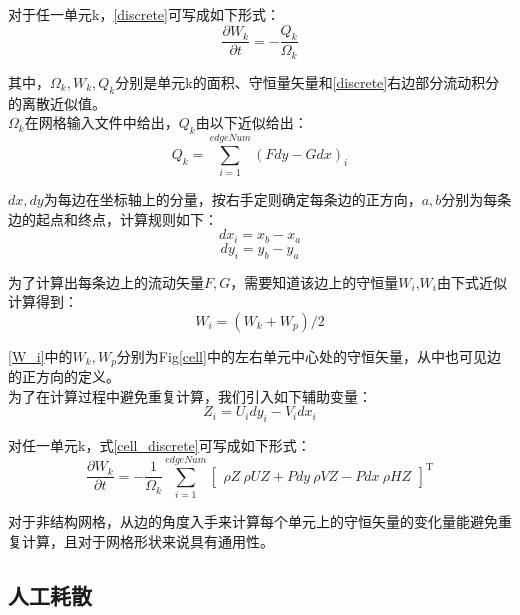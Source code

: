 \documentclass[UTF8]{ctexart}
\begin{document}
\indent 对于任一单元k，\eqref{discrete}可写成如下形式：
\begin{equation}\label{cell_discrete}
\frac{\partial W_k}{\partial t} = - \frac{Q_k}{\Omega_k}
\end{equation}

\indent 其中，$\Omega_k, W_k, Q_k$分别是单元k的面积、守恒量矢量和\eqref{discrete}右边部分流动积分的离散近似值。\\
\indent $\Omega_k$在网格输入文件中给出，$Q_k$由以下近似给出：
\begin{equation}\label{Q_k}
Q_k=\sum_{i=1}^{edgeNum} (Fdy-Gdx)_i 
\end{equation}

\indent $dx,dy$为每边在坐标轴上的分量，按右手定则确定每条边的正方向，$a,b$分别为每条边的起点和终点，计算规则如下：
\begin{equation}
dx_i=x_b-x_a 
\end{equation}
\begin{equation}
dy_i=y_b-y_a
\end{equation}

\indent 为了计算出每条边上的流动矢量$F,G$，需要知道该边上的守恒量$W_i$,$W_i$由下式近似计算得到：
\begin{equation}\label{W_i}
W_i=(W_k+W_p)/2
\end{equation}

\indent \eqref{W_i}中的$W_k,W_p$分别为Fig\ref{cell}中的左右单元中心处的守恒矢量，从中也可见边的正方向的定义。\\
\indent 为了在计算过程中避免重复计算，我们引入如下辅助变量：
\begin{equation}\label{aid_var}
Z_i=U_i dy_i - V_i dx_i
\end{equation}

\indent 对任一单元k，式\eqref{cell_discrete}可写成如下形式：
\begin{equation}
\frac{\partial W_k}{\partial t} = - \frac{1}{\Omega_k} \sum_{i=1}^{edgeNum}
 {\begin{bmatrix} \rho Z \ \rho UZ+Pdy \ \rho VZ-Pdx \ \rho HZ \end{bmatrix}}^\mathrm{T}
\end{equation}

\indent 对于非结构网格，从边的角度入手来计算每个单元上的守恒矢量的变化量能避免重复计算，且对于网格形状来说具有通用性。

\subsection{人工耗散}
\end{document}
